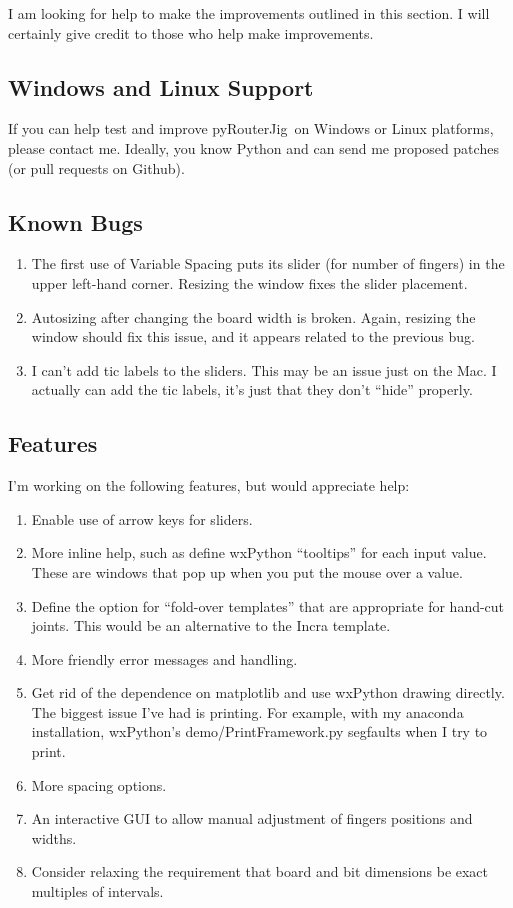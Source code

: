 \documentclass[12pt,final]{article}
\newcommand{\codename}[0]{pyRouterJig}
\begin{document}
I am looking for help to make the improvements outlined in this section.  I
will certainly give credit to those who help make improvements.

\subsection{Windows and Linux Support}

If you can help test and improve \codename~on Windows or Linux platforms,
please contact me.  Ideally, you know Python and can send me proposed patches
(or pull requests on Github).

\subsection{Known Bugs}

\begin{enumerate}
\item The first use of Variable Spacing puts its slider (for number of
  fingers) in the upper left-hand
  corner.  Resizing the window fixes the slider placement.
\item Autosizing after changing the board width is broken.  Again, resizing
  the window should fix this issue, and it appears related to the previous bug.
\item I can't add tic labels to the sliders.  This may be an issue just on
  the Mac.  I actually can add the tic labels, it's just that they don't
  ``hide'' properly.
\end{enumerate}

\subsection{Features}

I'm working on the following features, but would appreciate help:

\begin{enumerate}
\item Enable use of arrow keys for sliders.
\item More inline help, such as define wxPython ``tooltips'' for each input
  value.  These are windows that pop up when you put the mouse over a value.
\item Define the option for ``fold-over templates'' that are appropriate for
  hand-cut joints.  This would be an alternative to the Incra template.
\item More friendly error messages and handling.
\item Get rid of the dependence on matplotlib and use wxPython drawing
  directly.  The biggest issue I've had is printing.  For example, with my
  anaconda installation, wxPython's demo/PrintFramework.py segfaults when I
  try to print.
\item More spacing options.
\item An interactive GUI to allow manual adjustment of fingers positions and
  widths.
\item Consider relaxing the requirement that board and bit dimensions be exact multiples
of intervals.
\end{enumerate}
\end{document}
